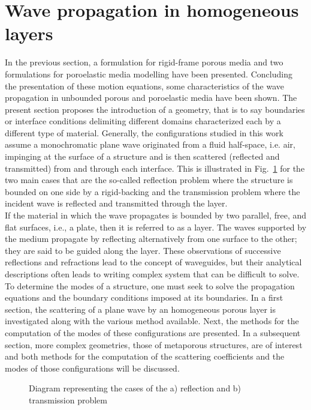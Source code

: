 \section{Wave propagation in homogeneous layers}
In the previous section, a formulation for rigid-frame porous media and two formulations for poroelastic media modelling have been presented. Concluding the presentation of these motion equations, some characteristics of the wave propagation in unbounded porous and poroelastic media have been shown. The present section proposes the introduction of a geometry, that is to say boundaries or interface conditions delimiting different domains characterized each by a different type of material. Generally, the configurations studied in this work assume a monochromatic plane wave originated from a fluid half-space, i.e. air, impinging at the surface of a structure and is then scattered (reflected and transmitted) from and through each interface. This is illustrated in Fig.~\ref{fig:refl_transm_pb_schema} for the two main cases that are the so-called reflection problem where the structure is bounded on one side by a rigid-backing and the transmission problem where the incident wave is reflected and transmitted through the layer.\\

If the material in which the wave propagates is bounded by two parallel, free, and flat surfaces, i.e., a plate, then it is referred to as a layer. The waves supported by the medium propagate by reflecting alternatively from one surface to the other; they are said to be guided along the layer. These observations of successive reflections and refractions lead to the concept of waveguides, but their analytical descriptions often leads to writing complex system that can be difficult to solve. To determine the modes of a structure, one must seek to solve the propagation equations and the boundary conditions imposed at its boundaries. In a first section, the scattering of a plane wave by an homogeneous porous layer is investigated along with the various method available. Next, the methods for the computation of the modes of these configurations are presented. In a subsequent section, more complex geometries, those of metaporous structures, are of interest and both methods for the computation of the scattering coefficients and the modes of those configurations will be discussed.

\begin{figure}[htpb]
    \centering
    
    \caption{Diagram representing the cases of the a) reflection and b) transmission problem}
    \label{fig:refl_transm_pb_schema}
\end{figure}

